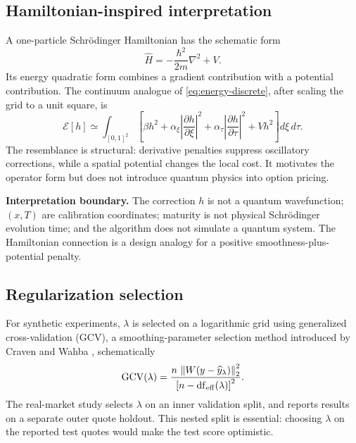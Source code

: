 \documentclass[11pt,a4paper]{article}
\begin{document}
\subsection{Hamiltonian-inspired interpretation}
A one-particle Schr\"odinger Hamiltonian has the schematic form \cite{Griffiths2018}
\begin{equation}\label{eq:schrodinger}
 \widehat H=-\frac{\hbar^2}{2m}\nabla^2+V.
\end{equation}
Its energy quadratic form combines a gradient contribution with a potential contribution. The continuum analogue of \eqref{eq:energy-discrete}, after scaling the grid to a unit square, is
\begin{equation}\label{eq:energy-continuous}
 \mathcal{E}[h]\simeq\int_{[0,1]^2}\!\left[
 \beta h^2+\alpha_\xi\left|\frac{\partial h}{\partial\xi}\right|^2+
 \alpha_\tau\left|\frac{\partial h}{\partial\tau}\right|^2+Vh^2
 \right]d\xi\,d\tau.
\end{equation}
The resemblance is structural: derivative penalties suppress oscillatory corrections, while a spatial potential changes the local cost. It motivates the operator form but does not introduce quantum physics into option pricing.

\begin{warningbox}
\textbf{Interpretation boundary.} The correction $h$ is not a quantum wavefunction; $(x,T)$ are calibration coordinates; maturity is not physical Schr\"odinger evolution time; and the algorithm does not simulate a quantum system. The Hamiltonian connection is a design analogy for a positive smoothness-plus-potential penalty.
\end{warningbox}

\subsection{Regularization selection}
For synthetic experiments, $\lambda$ is selected on a logarithmic grid using generalized cross-validation (GCV), a smoothing-parameter selection method introduced by Craven and Wahba \cite{CravenWahba1979}, schematically
\begin{equation}\label{eq:gcv}
 \operatorname{GCV}(\lambda)=
 \frac{n\,\left\lVert W(y-\widehat y_\lambda)\right\rVert_2^2}
 {\left[n-\operatorname{df}_{\mathrm{eff}}(\lambda)\right]^2}.
\end{equation}
The real-market study selects $\lambda$ on an inner validation split, and reports results on a separate outer quote holdout. This nested split is essential: choosing $\lambda$ on the reported test quotes would make the test score optimistic.
\end{document}
